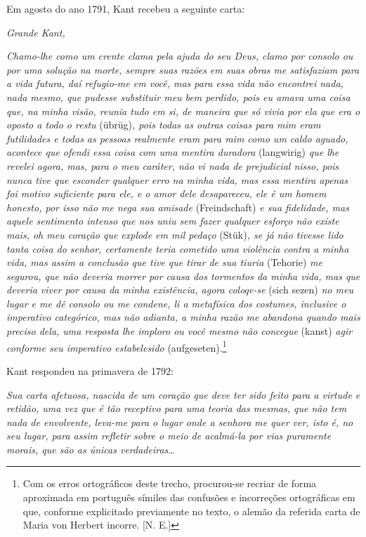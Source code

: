 Em agosto do ano 1791, Kant recebeu a seguinte carta:

\emph{Grande Kant,}

\emph{Chamo-lhe como um crente clama pela ajuda do seu Deus, clamo por
consolo ou por uma solução na morte, sempre suas razões em suas obras me
satisfaziam para a vida futura, daí refugio-me em você, mas para essa
vida não encontrei nada, nada mesmo, que pudesse substituir meu bem
perdido, pois eu amava uma coisa que, na minha visão, reunia tudo em si,
de maneira que só vivia por ela que era o oposto a todo o restu}
(übrüg)\emph{, pois todas as outras coisas para mim eram futilidades e
todas as pessoas realmente eram para mim como um caldo aguado, acontece
que ofendi essa coisa com uma mentira duradora} (langwirig) \emph{que
lhe revelei agora, mas, para o meu caráter, não vi nada de prejudicial
nisso, pois nunca tive que esconder qualquer erro na minha vida, mas
essa mentira apenas foi motivo suficiente para ele, e o amor dele
desapareceu, ele é um homem honesto, por isso não me nega sua amisade}
(Freindschaft) \emph{e sua fidelidade, mas aquele sentimento intenso que
nos uniu sem fazer qualquer esforço não existe mais, oh meu coração que
explode em mil pedaço} (Stük)\emph{, se já não tivesse lido tanta coisa
do senhor, certamente teria cometido uma violência contra a minha vida,
mas assim a conclusão que tive que tirar de sua tiuria} (Tehorie)
\emph{me segurou, que não deveria morrer por causa dos tormentos da
minha vida, mas que deveria viver por causa da minha existência, agora
coloqe-se} (sich sezen) \emph{no meu lugar e me dê consolo ou me
condene, li a metafísica dos costumes, inclusive o imperativo
categórico, mas não adianta, a minha razão me abandona quando mais
preciso dela, uma resposta lhe imploro ou você mesmo não concegue}
(kanst) \emph{agir conforme seu imperativo estabelesido}
(aufgeseten).\footnote{Com os erros ortográficos deste trecho,
  procurou-se recriar de forma aproximada em português símiles das
  confusões e incorreções ortográficas em que, conforme explicitado
  previamente no texto, o alemão da referida carta de Maria von Herbert
  incorre. [N. E.]}

Kant respondeu na primavera de 1792:

\emph{Sua carta afetuosa, nascida de um coração que deve ter sido feito
para a virtude e retidão, uma vez que é tão receptivo para uma teoria
das mesmas, que não tem nada de envolvente, leva-me para o lugar onde a
senhora me quer ver, isto é, no seu lugar, para assim refletir sobre o
meio de acalmá-la por vias puramente morais, que são as únicas
verdadeiras\ldots{}}

